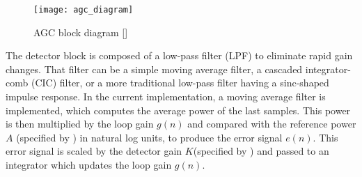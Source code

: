 



\begin{figure}[H]
  \centering
  \texttt{[image: agc\_diagram]}
  \caption{AGC block diagram [\citeauthor{mathworks_agc}]}
  \label{fig:agc_diagram}
\end{figure}

The detector block is composed of a low-pass filter (LPF) to eliminate rapid gain changes. That filter can be a simple moving average filter, a cascaded integrator-comb (CIC) filter, or a more traditional low-pass filter having a sinc-shaped impulse response. In the current implementation, a moving average filter is implemented, which computes the average power of the last  samples. This power is then multiplied by the loop gain $g(n)$ and compared with the reference power $A$ (specified by ) in natural log units, to produce the error signal $e(n)$. This error signal is scaled by the detector gain $K$(specified by ) and passed to an integrator which updates the loop gain $g(n)$.

